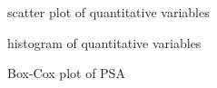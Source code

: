 \documentclass{article}
\begin{document}
\begin{center}
  \begin{figure}[htb]
    \caption{scatter plot of quantitative variables}
  \end{figure}

  \begin{figure}
    \caption{histogram of quantitative variables}
  \end{figure}

  \begin{figure}
    \caption{Box-Cox plot of PSA}
  \end{figure}


\end{center}
\end{document}
